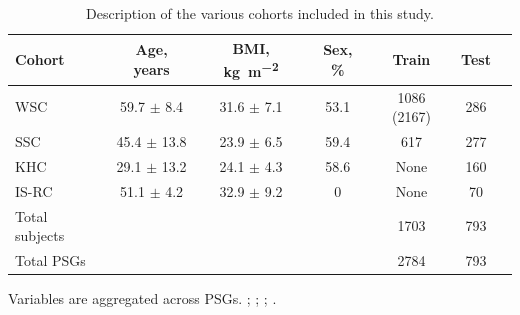 \begin{table}[tb]
\centering
\begin{threeparttable}  
\small
\caption[\acs{STAGES} cohorts]{Description of the various cohorts included in this study.}
\label{tab:sleep-stages:paper-iii:table-s01}
\begin{tabular}{@{}lcccccc@{}}
    \toprule
    \textbf{Cohort}         & \textbf{Age, years}       & \textbf{BMI, \si{\kilogram\per\meter\squared}}        & \textbf{Sex, \%}       & \textbf{Train}      & \textbf{Test}      \\ \midrule
    \ac{WSC}            & 59.7 $ \pm $ 8.4  & 31.6 $ \pm $ 7.1  & 53.1      & 1086 (2167)        & 286 \\
    \ac{SSC}            & 45.4 $ \pm $ 13.8 & 23.9 $ \pm $ 6.5  & 59.4      & 617                & 277 \\
    \ac{KHC}            & 29.1 $ \pm $ 13.2 & 24.1 $ \pm $ 4.3  & 58.6      & None               & 160 \\
    \ac{IS-RC}          & 51.1 $ \pm $ 4.2  & 32.9 $ \pm $ 9.2  & 0         & None               & 70 \\ \midrule
    Total subjects &                    &                   &           & 1703              & 793 \\
    Total \acsp{PSG} &                    &                   &           & 2784              & 793 \\ \bottomrule
\end{tabular}
\begin{tablenotes}
\small \item Variables are aggregated across \acp{PSG}. %
; %
; %
; %
.
\end{tablenotes}
\end{threeparttable}
\end{table}

